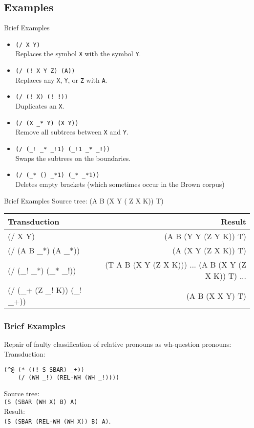 \documentclass[8pt]{beamer}
\begin{document}
\subsection{Examples}
\begin{frame}{Brief Examples}
  \begin {itemize}
  \item  \texttt{(/ X Y)}\\Replaces the symbol \texttt{X} with the symbol \texttt{Y}.
  \item  \texttt{(/ (!~X Y Z) (A))}\\Replaces any \texttt{X}, \texttt{Y}, or \texttt{Z} with \texttt{A}.
  \item  \texttt{(/ (!~X) (!~!))}\\Duplicates an \texttt{X}.
  \item  \texttt{(/ (X \_* Y) (X Y))}\\Remove all subtrees between \texttt{X} and \texttt{Y}.
  \item  \texttt{(/ (\_!~\_* \_!1) (\_!1 \_* \_!))}\\Swaps the subtrees on the boundaries.
  \item  \texttt{(/ (\_* () \_*1) (\_* \_*1))}\\ Deletes empty brackets (which sometimes occur in the Brown corpus)
  \end {itemize}
\end{frame}
\begin{frame}{Brief Examples}
  Source tree:  (A B (X Y ( Z X K)) T)   \\
  \begin{tabular} {l| r}
    Transduction  & Result \\
    \hline
    (/ X Y)       &         (A B (Y Y (Z Y K)) T)\\
    (/ (A B \_*) (A \_*))  &  (A (X Y (Z X K)) T)\\
    (/ (\_! \_*) (\_* \_!))  &   (T A B (X Y (Z X K)))  ... (A B (X Y (Z X K)) T) ... \\
    (/ (\_+ (Z \_! K)) (\_! \_+)) &  (A B (X X Y) T) \\
  \end{tabular}
\end{frame}

\begin{frame}[fragile]
  \frametitle{Brief Examples}
Repair of faulty classification of relative pronouns as wh-question pronouns:
Transduction:\\
\begin{verbatim}
(^@ (* ((! S SBAR) _+))
    (/ (WH _!) (REL-WH (WH _!))))
\end{verbatim}
Source tree:  \\
\texttt{(S (SBAR (WH X) B) A)}\\

Result:\\
\texttt{(S (SBAR (REL-WH (WH X)) B) A)}.
\end{frame}
\end{document}
